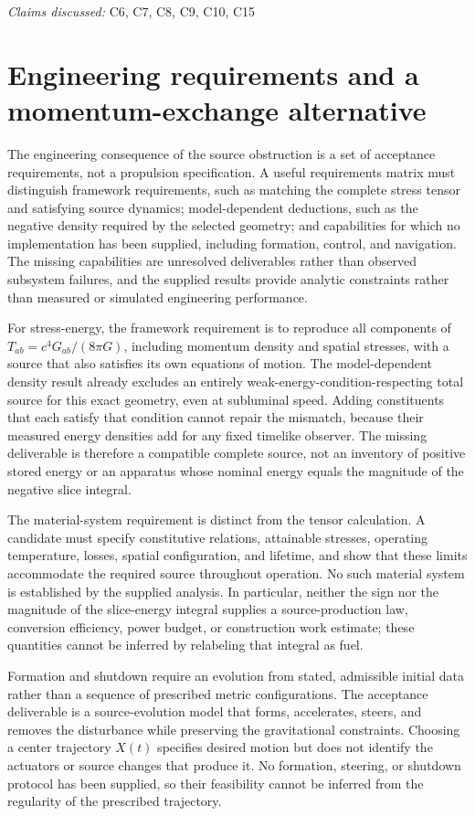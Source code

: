 \documentclass[11pt]{article}
\begin{document}
\textit{Claims discussed: }C6, C7, C8, C9, C10, C15
\section{Engineering requirements and a momentum-exchange alternative}
The engineering consequence of the source obstruction is a set of acceptance requirements, not a propulsion specification. A useful requirements matrix must distinguish framework requirements, such as matching the complete stress tensor and satisfying source dynamics; model-dependent deductions, such as the negative density required by the selected geometry; and capabilities for which no implementation has been supplied, including formation, control, and navigation. The missing capabilities are unresolved deliverables rather than observed subsystem failures, and the supplied results provide analytic constraints rather than measured or simulated engineering performance.

For stress-energy, the framework requirement is to reproduce all components of $T_{ab}=c^4G_{ab}/(8\pi G)$, including momentum density and spatial stresses, with a source that also satisfies its own equations of motion. The model-dependent density result already excludes an entirely weak-energy-condition-respecting total source for this exact geometry, even at subluminal speed. Adding constituents that each satisfy that condition cannot repair the mismatch, because their measured energy densities add for any fixed timelike observer. The missing deliverable is therefore a compatible complete source, not an inventory of positive stored energy or an apparatus whose nominal energy equals the magnitude of the negative slice integral.

The material-system requirement is distinct from the tensor calculation. A candidate must specify constitutive relations, attainable stresses, operating temperature, losses, spatial configuration, and lifetime, and show that these limits accommodate the required source throughout operation. No such material system is established by the supplied analysis. In particular, neither the sign nor the magnitude of the slice-energy integral supplies a source-production law, conversion efficiency, power budget, or construction work estimate; these quantities cannot be inferred by relabeling that integral as fuel.

Formation and shutdown require an evolution from stated, admissible initial data rather than a sequence of prescribed metric configurations. The acceptance deliverable is a source-evolution model that forms, accelerates, steers, and removes the disturbance while preserving the gravitational constraints. Choosing a center trajectory $X(t)$ specifies desired motion but does not identify the actuators or source changes that produce it. No formation, steering, or shutdown protocol has been supplied, so their feasibility cannot be inferred from the regularity of the prescribed trajectory.
\end{document}

